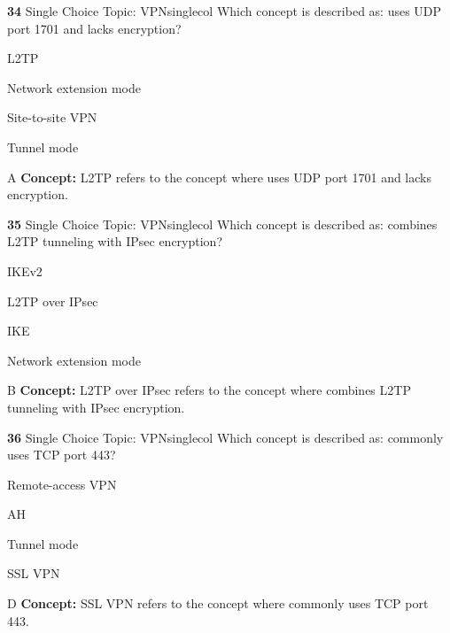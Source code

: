 \documentclass[10pt,a4paper]{article}
\begin{document}
\begin{qcard}{\color{white}\textbf{34} \hfill \small Single Choice \textbar{} Topic: VPN}{singlecol}
Which concept is described as: uses UDP port 1701 and lacks encryption?

\begin{qoptions}
\item L2TP
\item Network extension mode
\item Site-to-site VPN
\item Tunnel mode
\end{qoptions}
\begin{explainbox}{A}
\textbf{Concept:} L2TP refers to the concept where uses UDP port 1701 and lacks encryption.
\end{explainbox}
\end{qcard}

\begin{qcard}{\color{white}\textbf{35} \hfill \small Single Choice \textbar{} Topic: VPN}{singlecol}
Which concept is described as: combines L2TP tunneling with IPsec encryption?

\begin{qoptions}
\item IKEv2
\item L2TP over IPsec
\item IKE
\item Network extension mode
\end{qoptions}
\begin{explainbox}{B}
\textbf{Concept:} L2TP over IPsec refers to the concept where combines L2TP tunneling with IPsec encryption.
\end{explainbox}
\end{qcard}

\begin{qcard}{\color{white}\textbf{36} \hfill \small Single Choice \textbar{} Topic: VPN}{singlecol}
Which concept is described as: commonly uses TCP port 443?

\begin{qoptions}
\item Remote-access VPN
\item AH
\item Tunnel mode
\item SSL VPN
\end{qoptions}
\begin{explainbox}{D}
\textbf{Concept:} SSL VPN refers to the concept where commonly uses TCP port 443.
\end{explainbox}
\end{qcard}
\end{document}

